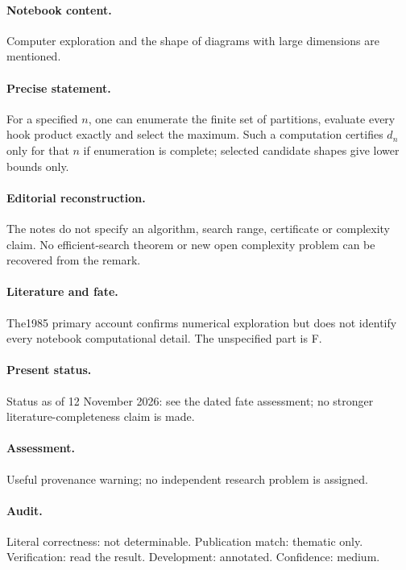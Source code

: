 \paragraph{Notebook content.} Computer exploration and the shape of diagrams with large dimensions are mentioned.

\paragraph{Precise statement.} For a specified $n$, one can enumerate the finite set of partitions, evaluate every hook product exactly and select the maximum. Such a computation certifies $d_n$ only for that $n$ if enumeration is complete; selected candidate shapes give lower bounds only.

\paragraph{Editorial reconstruction.} The notes do not specify an algorithm, search range, certificate or complexity claim. No efficient-search theorem or new open complexity problem can be recovered from the remark.

\paragraph{Literature and fate.} The1985 primary account confirms numerical exploration but does not identify every notebook computational detail. The unspecified part is F.

\paragraph{Present status.} Status as of 12 November 2026: see the dated fate assessment; no stronger literature-completeness claim is made.

\paragraph{Assessment.} Useful provenance warning; no independent research problem is assigned.

\paragraph{Audit.} Literal correctness: not determinable. Publication match: thematic only. Verification: read the result. Development: annotated. Confidence: medium.

